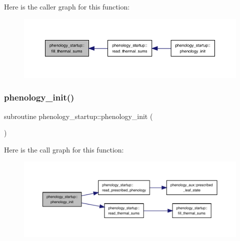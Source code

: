 Here is the caller graph for this function\+:
\nopagebreak
\begin{figure}[H]
\begin{center}
\leavevmode
\includegraphics[width=350pt]{namespacephenology__startup_a7e3ac783d1459d2f3ac41c2af6d761c9_icgraph}
\end{center}
\end{figure}
\mbox{\label{namespacephenology__startup_abebba7585ef5aec3dd00f7cfa0b56067}} 
\subsubsection{\texorpdfstring{phenology\+\_\+init()}{phenology\_init()}}
{\footnotesize\ttfamily subroutine phenology\+\_\+startup\+::phenology\+\_\+init (\begin{DoxyParamCaption}{ }\end{DoxyParamCaption})}

Here is the call graph for this function\+:
\nopagebreak
\begin{figure}[H]
\begin{center}
\leavevmode
\includegraphics[width=350pt]{namespacephenology__startup_abebba7585ef5aec3dd00f7cfa0b56067_cgraph}
\end{center}
\end{figure}
\mbox{\label{namespacephenology__startup_aa83586e75a022d6fcb5816972361282d}} 
